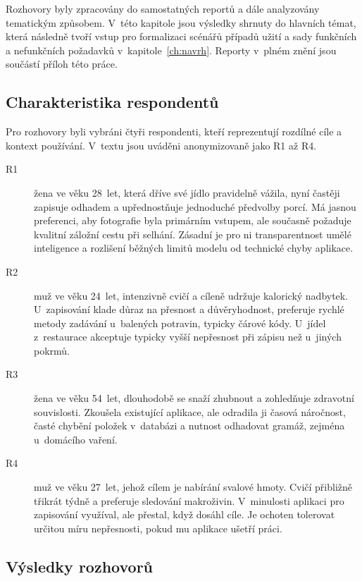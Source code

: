 Rozhovory byly zpracovány do samostatných reportů a dále analyzovány tematickým způsobem.
V~této kapitole jsou výsledky shrnuty do hlavních témat, která následně tvoří vstup pro formalizaci scénářů případů užití a sady funkčních a nefunkčních požadavků v~kapitole~\ref{ch:navrh}.
Reporty v~plném znění jsou součástí příloh této práce.

\subsection{Charakteristika respondentů}
\label{subsec:participanti}

Pro rozhovory byli vybráni čtyři respondenti, kteří reprezentují rozdílné cíle a kontext používání.
V~textu jsou uváděni anonymizovaně jako R1 až R4.

\begin{description}
	\item[R1] žena ve věku 28~let, která dříve své jídlo pravidelně vážila, nyní častěji zapisuje odhadem a upřednostňuje jednoduché předvolby porcí.
		Má jasnou preferenci, aby fotografie byla primárním vstupem, ale současně požaduje kvalitní záložní cestu při selhání.
		Zásadní je pro ni transparentnost umělé inteligence a rozlišení běžných limitů modelu od technické chyby aplikace.
	\item[R2] muž ve věku 24~let, intenzivně cvičí a cíleně udržuje kalorický nadbytek.
		U~zapisování klade důraz na přesnost a důvěryhodnost, preferuje rychlé metody zadávání u~balených potravin, typicky čárové kódy.
		U~jídel z~restaurace akceptuje typicky vyšší nepřesnost při zápisu než u~jiných pokrmů.
	\item[R3] žena ve věku 54~let, dlouhodobě se snaží zhubnout a zohledňuje zdravotní souvislosti.
		Zkoušela existující aplikace, ale odradila ji časová náročnost, časté chybění položek v~databázi a nutnost odhadovat gramáž, zejména u~domácího vaření.
	\item[R4] muž ve věku 27~let, jehož cílem je nabírání svalové hmoty.
		Cvičí přibližně třikrát týdně a preferuje sledování makroživin.
		V~minulosti aplikaci pro zapisování využíval, ale přestal, když dosáhl cíle.
		Je ochoten tolerovat určitou míru nepřesnosti, pokud mu aplikace ušetří práci.
\end{description}

\subsection{Výsledky rozhovorů}
\label{subsec:vysledkyRozhovoru}

